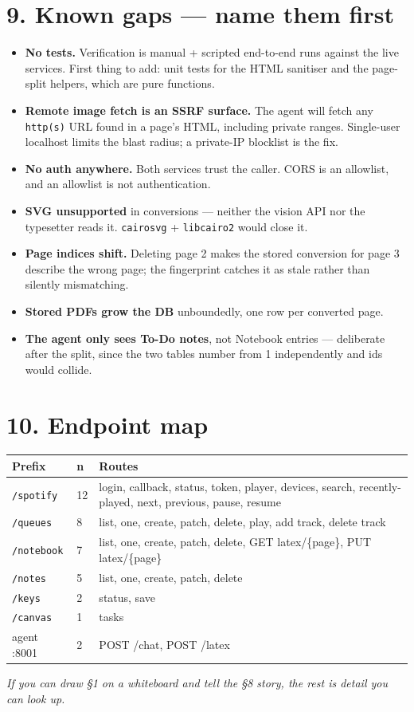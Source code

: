\documentclass[10pt]{article}
\newcommand{\code}[1]{\texttt{\small #1}}
\begin{document}
\section*{9. Known gaps --- name them first}

\begin{itemize}
\item \textbf{No tests.} Verification is manual + scripted end-to-end runs against the live services. First thing to add: unit tests for the HTML sanitiser and the page-split helpers, which are pure functions.
\item \textbf{Remote image fetch is an SSRF surface.} The agent will fetch any \code{http(s)} URL found in a page's HTML, including private ranges. Single-user localhost limits the blast radius; a private-IP blocklist is the fix.
\item \textbf{No auth anywhere.} Both services trust the caller. CORS is an allowlist, and an allowlist is not authentication.
\item \textbf{SVG unsupported} in conversions --- neither the vision API nor the typesetter reads it. \code{cairosvg} + \code{libcairo2} would close it.
\item \textbf{Page indices shift.} Deleting page 2 makes the stored conversion for page 3 describe the wrong page; the fingerprint catches it as stale rather than silently mismatching.
\item \textbf{Stored PDFs grow the DB} unboundedly, one row per converted page.
\item \textbf{The agent only sees To-Do notes}, not Notebook entries --- deliberate after the split, since the two tables number from 1 independently and ids would collide.
\end{itemize}

\section*{10. Endpoint map}

\begin{tabular}{@{}p{2.4cm}p{1cm}p{13.6cm}@{}}
\toprule
\textbf{Prefix} & \textbf{n} & \textbf{Routes} \\
\midrule
\code{/spotify} & 12 & login, callback, status, token, player, devices, search, recently-played, next, previous, pause, resume \\
\code{/queues} & 8 & list, one, create, patch, delete, play, add track, delete track \\
\code{/notebook} & 7 & list, one, create, patch, delete, GET latex/\{page\}, PUT latex/\{page\} \\
\code{/notes} & 5 & list, one, create, patch, delete \\
\code{/keys} & 2 & status, save \\
\code{/canvas} & 1 & tasks \\
\midrule
agent :8001 & 2 & POST /chat, POST /latex \\
\bottomrule
\end{tabular}

\vspace{4mm}
\begin{center}
\footnotesize\itshape If you can draw \S1 on a whiteboard and tell the \S8 story, the rest is detail you can look up.
\end{center}
\end{document}
